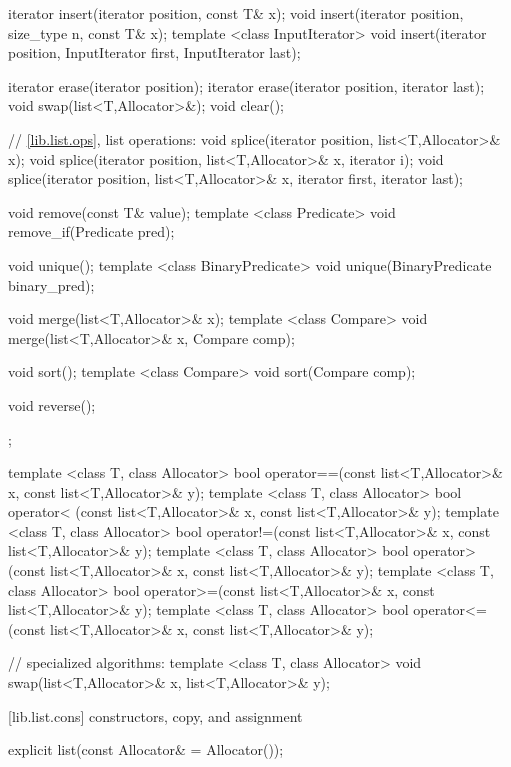 \begin{codeblock}
{{    iterator insert(iterator position, const T& x);
    void     insert(iterator position, size_type n, const T& x);
    template <class InputIterator>
      void insert(iterator position, InputIterator first,
                  InputIterator last);

    iterator erase(iterator position);
    iterator erase(iterator position, iterator last);
    void     swap(list<T,Allocator>&);
    void     clear();

    // \ref{lib.list.ops}, list operations:
    void splice(iterator position, list<T,Allocator>& x);
    void splice(iterator position, list<T,Allocator>& x, iterator i);
    void splice(iterator position, list<T,Allocator>& x, iterator first,
                iterator last);

    void remove(const T& value);
    template <class Predicate> void remove_if(Predicate pred);

    void unique();
    template <class BinaryPredicate>
      void unique(BinaryPredicate binary_pred);

    void merge(list<T,Allocator>& x);
    template <class Compare> void merge(list<T,Allocator>& x, Compare comp);

    void sort();
    template <class Compare> void sort(Compare comp);

    void reverse();
  };

  template <class T, class Allocator>
    bool operator==(const list<T,Allocator>& x, const list<T,Allocator>& y);
  template <class T, class Allocator>
    bool operator< (const list<T,Allocator>& x, const list<T,Allocator>& y);
  template <class T, class Allocator>
    bool operator!=(const list<T,Allocator>& x, const list<T,Allocator>& y);
  template <class T, class Allocator>
    bool operator> (const list<T,Allocator>& x, const list<T,Allocator>& y);
  template <class T, class Allocator>
    bool operator>=(const list<T,Allocator>& x, const list<T,Allocator>& y);
  template <class T, class Allocator>
    bool operator<=(const list<T,Allocator>& x, const list<T,Allocator>& y);

  // specialized algorithms:
  template <class T, class Allocator>
    void swap(list<T,Allocator>& x, list<T,Allocator>& y);
}
\end{codeblock}

[lib.list.cons]{ constructors, copy, and assignment}

%
%
\begin{itemdecl}
explicit list(const Allocator& = Allocator());
\end{itemdecl}

